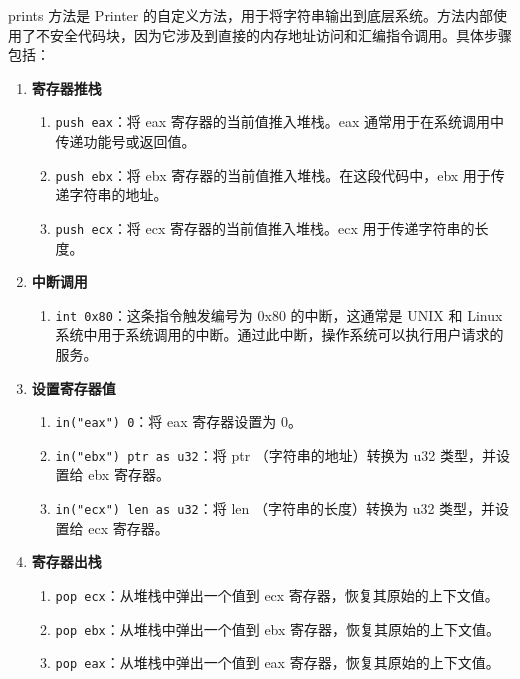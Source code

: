prints 方法是 Printer 的自定义方法，用于将字符串输出到底层系统。方法内部使用了不安全代码块，因为它涉及到直接的内存地址访问和汇编指令调用。具体步骤包括：

\begin{enumerate}
    \item \textbf{寄存器推栈}
          \begin{enumerate}
              \item \texttt{push eax}：将 eax 寄存器的当前值推入堆栈。eax 通常用于在系统调用中传递功能号或返回值。
              \item \texttt{push ebx}：将 ebx 寄存器的当前值推入堆栈。在这段代码中，ebx 用于传递字符串的地址。
              \item \texttt{push ecx}：将 ecx 寄存器的当前值推入堆栈。ecx 用于传递字符串的长度。
          \end{enumerate}
    \item \textbf{中断调用}
          \begin{enumerate}
              \item \texttt{int 0x80}：这条指令触发编号为 0x80 的中断，这通常是 UNIX 和 Linux 系统中用于系统调用的中断。通过此中断，操作系统可以执行用户请求的服务。
          \end{enumerate}
    \item \textbf{设置寄存器值}
          \begin{enumerate}
              \item \texttt{in("eax") 0}：将 eax 寄存器设置为 0。
              \item \texttt{in("ebx") ptr as u32}：将 ptr （字符串的地址）转换为 u32 类型，并设置给 ebx 寄存器。
              \item \texttt{in("ecx") len as u32}：将 len （字符串的长度）转换为 u32 类型，并设置给 ecx 寄存器。
          \end{enumerate}
    \item \textbf{寄存器出栈}
          \begin{enumerate}
              \item \texttt{pop ecx}：从堆栈中弹出一个值到 ecx 寄存器，恢复其原始的上下文值。
              \item \texttt{pop ebx}：从堆栈中弹出一个值到 ebx 寄存器，恢复其原始的上下文值。
              \item \texttt{pop eax}：从堆栈中弹出一个值到 eax 寄存器，恢复其原始的上下文值。
          \end{enumerate}
\end{enumerate}

